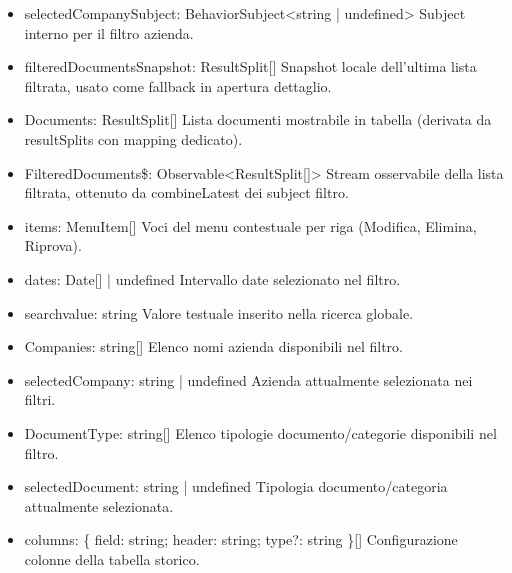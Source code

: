 \documentclass[a4paper,11pt]{article}
\begin{document}
\begin{itemize}[noitemsep, topsep=0pt]
\item selectedCompanySubject: BehaviorSubject<string | undefined>
Subject interno per il filtro azienda.

\item filteredDocumentsSnapshot: ResultSplit[]
Snapshot locale dell’ultima lista filtrata, usato come fallback in apertura dettaglio.

\item Documents: ResultSplit[]
Lista documenti mostrabile in tabella (derivata da resultSplits con mapping dedicato).

\item FilteredDocuments\$: Observable<ResultSplit[]>
Stream osservabile della lista filtrata, ottenuto da combineLatest dei subject filtro.

\item items: MenuItem[]
Voci del menu contestuale per riga (Modifica, Elimina, Riprova).

\item dates: Date[] | undefined
Intervallo date selezionato nel filtro.

\item searchvalue: string
Valore testuale inserito nella ricerca globale.

\item Companies: string[]
Elenco nomi azienda disponibili nel filtro.

\item selectedCompany: string | undefined
Azienda attualmente selezionata nei filtri.

\item DocumentType: string[]
Elenco tipologie documento/categorie disponibili nel filtro.

\item selectedDocument: string | undefined
Tipologia documento/categoria attualmente selezionata.

\item columns: \{ field: string; header: string; type?: string \}[]
Configurazione colonne della tabella storico.
\end{itemize}
\end{document}
